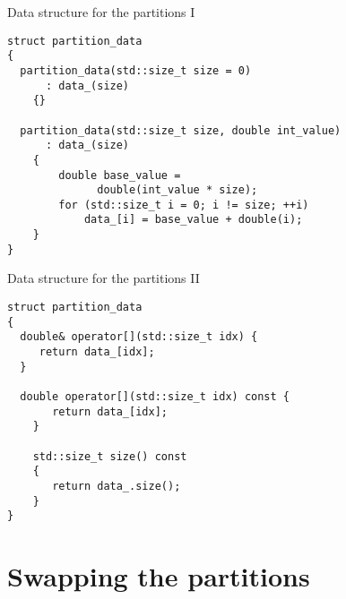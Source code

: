 \documentclass[12pt,t]{beamer}
\begin{document}
\begin{frame}[fragile]{Data structure for the partitions I}

\begin{lstlisting}
struct partition_data
{
  partition_data(std::size_t size = 0)
      : data_(size)
    {}

  partition_data(std::size_t size, double int_value)
      : data_(size)
    {
        double base_value = 
              double(int_value * size);
        for (std::size_t i = 0; i != size; ++i)
            data_[i] = base_value + double(i);
    }
}
\end{lstlisting}


\end{frame}

\begin{frame}[fragile]{Data structure for the partitions II}

\begin{lstlisting}
struct partition_data
{
  double& operator[](std::size_t idx) { 
     return data_[idx]; 
  }
    
  double operator[](std::size_t idx) const { 
       return data_[idx]; 
    }

    std::size_t size() const 
    { 
       return data_.size(); 
    }
}
\end{lstlisting}


\end{frame}

\section{Swapping the partitions}
\end{document}

